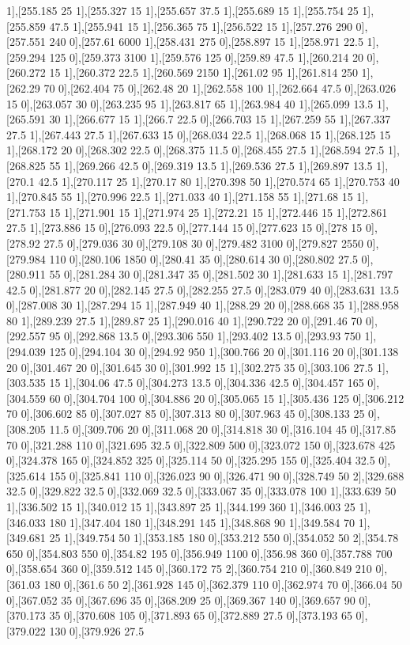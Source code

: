{1],[255.185 25 1],[255.327 15 1],[255.657 37.5 1],[255.689 15 1],[255.754 25 1],[255.859 47.5 1],[255.941 15 1],[256.365 75 1],[256.522 15 1],[257.276 290 0],[257.551 240 0],[257.61 6000 1],[258.431 275 0],[258.897 15 1],[258.971 22.5 1],[259.294 125 0],[259.373 3100 1],[259.576 125 0],[259.89 47.5 1],[260.214 20 0],[260.272 15 1],[260.372 22.5 1],[260.569 2150 1],[261.02 95 1],[261.814 250 1],[262.29 70 0],[262.404 75 0],[262.48 20 1],[262.558 100 1],[262.664 47.5 0],[263.026 15 0],[263.057 30 0],[263.235 95 1],[263.817 65 1],[263.984 40 1],[265.099 13.5 1],[265.591 30 1],[266.677 15 1],[266.7 22.5 0],[266.703 15 1],[267.259 55 1],[267.337 27.5 1],[267.443 27.5 1],[267.633 15 0],[268.034 22.5 1],[268.068 15 1],[268.125 15 1],[268.172 20 0],[268.302 22.5 0],[268.375 11.5 0],[268.455 27.5 1],[268.594 27.5 1],[268.825 55 1],[269.266 42.5 0],[269.319 13.5 1],[269.536 27.5 1],[269.897 13.5 1],[270.1 42.5 1],[270.117 25 1],[270.17 80 1],[270.398 50 1],[270.574 65 1],[270.753 40 1],[270.845 55 1],[270.996 22.5 1],[271.033 40 1],[271.158 55 1],[271.68 15 1],[271.753 15 1],[271.901 15 1],[271.974 25 1],[272.21 15 1],[272.446 15 1],[272.861 27.5 1],[273.886 15 0],[276.093 22.5 0],[277.144 15 0],[277.623 15 0],[278 15 0],[278.92 27.5 0],[279.036 30 0],[279.108 30 0],[279.482 3100 0],[279.827 2550 0],[279.984 110 0],[280.106 1850 0],[280.41 35 0],[280.614 30 0],[280.802 27.5 0],[280.911 55 0],[281.284 30 0],[281.347 35 0],[281.502 30 1],[281.633 15 1],[281.797 42.5 0],[281.877 20 0],[282.145 27.5 0],[282.255 27.5 0],[283.079 40 0],[283.631 13.5 0],[287.008 30 1],[287.294 15 1],[287.949 40 1],[288.29 20 0],[288.668 35 1],[288.958 80 1],[289.239 27.5 1],[289.87 25 1],[290.016 40 1],[290.722 20 0],[291.46 70 0],[292.557 95 0],[292.868 13.5 0],[293.306 550 1],[293.402 13.5 0],[293.93 750 1],[294.039 125 0],[294.104 30 0],[294.92 950 1],[300.766 20 0],[301.116 20 0],[301.138 20 0],[301.467 20 0],[301.645 30 0],[301.992 15 1],[302.275 35 0],[303.106 27.5 1],[303.535 15 1],[304.06 47.5 0],[304.273 13.5 0],[304.336 42.5 0],[304.457 165 0],[304.559 60 0],[304.704 100 0],[304.886 20 0],[305.065 15 1],[305.436 125 0],[306.212 70 0],[306.602 85 0],[307.027 85 0],[307.313 80 0],[307.963 45 0],[308.133 25 0],[308.205 11.5 0],[309.706 20 0],[311.068 20 0],[314.818 30 0],[316.104 45 0],[317.85 70 0],[321.288 110 0],[321.695 32.5 0],[322.809 500 0],[323.072 150 0],[323.678 425 0],[324.378 165 0],[324.852 325 0],[325.114 50 0],[325.295 155 0],[325.404 32.5 0],[325.614 155 0],[325.841 110 0],[326.023 90 0],[326.471 90 0],[328.749 50 2],[329.688 32.5 0],[329.822 32.5 0],[332.069 32.5 0],[333.067 35 0],[333.078 100 1],[333.639 50 1],[336.502 15 1],[340.012 15 1],[343.897 25 1],[344.199 360 1],[346.003 25 1],[346.033 180 1],[347.404 180 1],[348.291 145 1],[348.868 90 1],[349.584 70 1],[349.681 25 1],[349.754 50 1],[353.185 180 0],[353.212 550 0],[354.052 50 2],[354.78 650 0],[354.803 550 0],[354.82 195 0],[356.949 1100 0],[356.98 360 0],[357.788 700 0],[358.654 360 0],[359.512 145 0],[360.172 75 2],[360.754 210 0],[360.849 210 0],[361.03 180 0],[361.6 50 2],[361.928 145 0],[362.379 110 0],[362.974 70 0],[366.04 50 0],[367.052 35 0],[367.696 35 0],[368.209 25 0],[369.367 140 0],[369.657 90 0],[370.173 35 0],[370.608 105 0],[371.893 65 0],[372.889 27.5 0],[373.193 65 0],[379.022 130 0],[379.926 27.5 }
